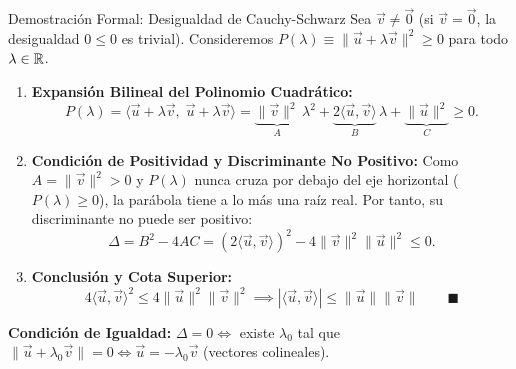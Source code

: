 \documentclass[10pt,aspectratio=169]{beamer}
\begin{document}
\begin{frame}{Demostración Formal: Desigualdad de Cauchy-Schwarz}
  \footnotesize
  Sea $\vec{v} \neq \vec{0}$ (si $\vec{v} = \vec{0}$, la desigualdad $0 \le 0$ es trivial). Consideremos $P(\lambda) \equiv \|\vec{u} + \lambda \vec{v}\|^2 \ge 0$ para todo $\lambda \in \mathbb{R}$.
  \vspace{0.12cm}

  \begin{enumerate}\itemsep4pt
    \item \textbf{Expansión Bilineal del Polinomio Cuadrático:}
    \[
    P(\lambda) = \langle \vec{u} + \lambda \vec{v},\; \vec{u} + \lambda \vec{v} \rangle = \underbrace{\|\vec{v}\|^2}_{A}\,\lambda^2 + \underbrace{2\langle \vec{u}, \vec{v} \rangle}_{B}\,\lambda + \underbrace{\|\vec{u}\|^2}_{C} \ge 0.
    \]
    \item \textbf{Condición de Positividad y Discriminante No Positivo:}
    Como $A = \|\vec{v}\|^2 > 0$ y $P(\lambda)$ nunca cruza por debajo del eje horizontal ($P(\lambda) \ge 0$), la parábola tiene a lo más una raíz real. Por tanto, su discriminante no puede ser positivo:
    \[
    \Delta = B^2 - 4AC = (2\langle \vec{u}, \vec{v} \rangle)^2 - 4\|\vec{v}\|^2 \|\vec{u}\|^2 \le 0.
    \]
    \item \textbf{Conclusión y Cota Superior:}
    \[
    4\langle \vec{u}, \vec{v} \rangle^2 \le 4\|\vec{u}\|^2 \|\vec{v}\|^2 \implies \boxed{|\langle \vec{u}, \vec{v} \rangle| \le \|\vec{u}\|\|\vec{v}\|} \qquad \blacksquare
    \]
  \end{enumerate}
  \vspace{0.05cm}
  {\scriptsize \textbf{Condición de Igualdad:} $\Delta = 0 \iff$ existe $\lambda_0$ tal que $\|\vec{u} + \lambda_0\vec{v}\| = 0 \iff \vec{u} = -\lambda_0\vec{v}$ (vectores colineales).}
\end{frame}
\end{document}
